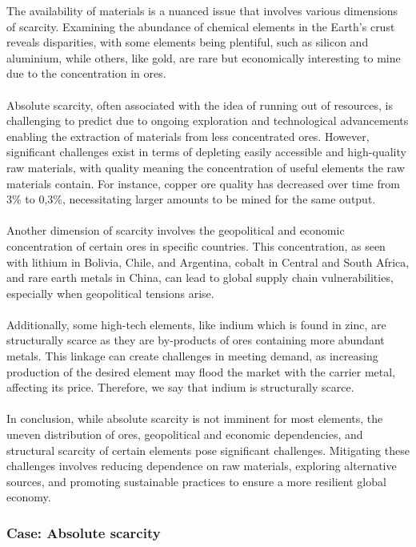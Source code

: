 \documentclass[../summary.tex]{subfiles}
\begin{document}
The availability of materials is a nuanced issue that involves various dimensions of scarcity. Examining the abundance of chemical elements in the Earth's crust reveals disparities, with some elements being plentiful, such as silicon and aluminium, while others, like gold, are rare but economically interesting to mine due to the concentration in ores.\\
\\
Absolute scarcity, often associated with the idea of running out of resources, is challenging to predict due to ongoing exploration and technological advancements enabling the extraction of materials from less concentrated ores. However, significant challenges exist in terms of depleting easily accessible and high-quality raw materials, with quality meaning the concentration of useful elements the raw materials contain. For instance, copper ore quality has decreased over time from 3\% to 0,3\%, necessitating larger amounts to be mined for the same output.\\
\\
Another dimension of scarcity involves the geopolitical and economic concentration of certain ores in specific countries. This concentration, as seen with lithium in Bolivia, Chile, and Argentina, cobalt in Central and South Africa, and rare earth metals in China, can lead to global supply chain vulnerabilities, especially when geopolitical tensions arise.\\
\\
Additionally, some high-tech elements, like indium which is found in zinc, are structurally scarce as they are by-products of ores containing more abundant metals. This linkage can create challenges in meeting demand, as increasing production of the desired element may flood the market with the carrier metal, affecting its price. Therefore, we say that indium is structurally scarce.\\
\\
In conclusion, while absolute scarcity is not imminent for most elements, the uneven distribution of ores, geopolitical and economic dependencies, and structural scarcity of certain elements pose significant challenges. Mitigating these challenges involves reducing dependence on raw materials, exploring alternative sources, and promoting sustainable practices to ensure a more resilient global economy.

\subsubsection{Case: Absolute scarcity}
\end{document}

